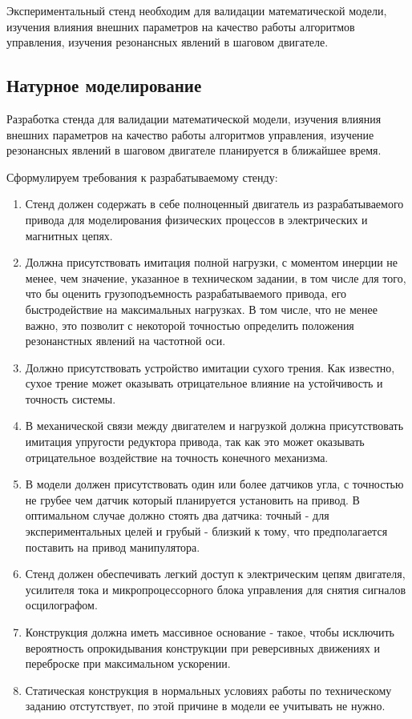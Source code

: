\ifdefined\DIPLOMA
    Экспериментальный стенд необходим для валидации математической модели,
    изучения влияния внешних параметров на качество работы алгоритмов управления,
    изучения резонансных явлений в шаговом двигателе.
\else
    \subsection{Натурное моделирование}
    Разработка стенда для валидации математической модели, изучения влияния внешних параметров
    на качество работы алгоритмов управления, изучение резонансных явлений в шаговом
    двигателе планируется в ближайшее время.
\fi

Сформулируем требования к разрабатываемому стенду:

\begin{enumerate}
    \item Стенд должен содержать в себе полноценный двигатель из разрабатываемого
    привода для моделирования физических процессов в электрических и магнитных цепях.

    \item Должна присутствовать имитация полной нагрузки, с моментом инерции не менее, чем
    значение, указанное в техническом задании, в том числе для того, что бы оценить
    грузоподъемность разрабатываемого привода, его быстродействие на максимальных
    нагрузках. В том числе, что не менее важно, это позволит с некоторой точностью
    определить положения резонанстных явлений на частотной оси.

    \item Должно присутствовать устройство имитации сухого трения. Как
    известно, сухое трение может оказывать отрицательное влияние на устойчивость
    и точность системы.

    \item В механической связи между двигателем и нагрузкой должна присутствовать имитация
    упругости редуктора привода, так как это может оказывать отрицательное воздействие
    на точность конечного механизма.

    \item В модели должен присутствовать один или более датчиков угла, с точностью не
    грубее чем датчик который планируется установить на привод. В оптимальном случае должно
    стоять два датчика: точный - для экспериментальных целей и грубый - близкий
    к тому, что предполагается поставить на привод манипулятора.

    \item Стенд должен обеспечивать легкий доступ к электрическим цепям двигателя,
    усилителя тока и микропроцессорного блока управления для снятия сигналов
    осцилографом.

    \item Конструкция должна иметь массивное основание - такое, чтобы
    исключить вероятность опрокидывания конструкции при реверсивных движениях
    и переброске при максимальном ускорении.

    \item Статическая конструкция в нормальных условиях работы по техническому
    заданию отстутствует, по этой причине в модели ее учитывать не нужно.
\end{enumerate}

